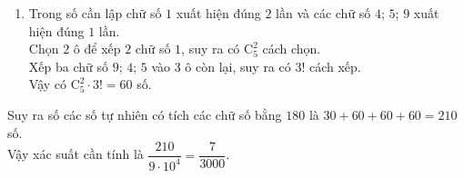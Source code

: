 \begin{bt}
{\begin{enumerate}[TH.1]
			Xếp ba chữ số $1$; $9$; $5$ vào $3$ ô còn lại, suy ra có $3!$ cách xếp.\\
			Vậy có $\mathrm{C}^2_5 \cdot 3! = 60$ số.
			\item Trong số cần lập chữ số $1$ xuất hiện đúng $2$ lần và các chữ số $4$; $5$; $9$ xuất hiện đúng $1$ lần.\\
			Chọn $2$ ô để xếp $2$ chữ số $1$, suy ra có $\mathrm{C}^2_5$ cách chọn.\\
			Xếp ba chữ số $9$; $4$; $5$ vào $3$ ô còn lại, suy ra có $3!$ cách xếp.\\
			Vậy có $\mathrm{C}^2_5 \cdot 3! = 60$ số.
		\end{enumerate}
		Suy ra số các số tự nhiên có tích các chữ số bằng $180$ là $30+60+60+60=210$ số.\\
		Vậy xác suất cần tính là $\dfrac{210}{9 \cdot 10^4} = \dfrac{7}{3000}$.
	}
\end{bt}

